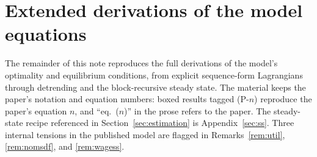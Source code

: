 \documentclass[11pt]{article}
\theoremstyle{definition}
\begin{document}
\newpage

\appendix
\section{Extended derivations of the model equations}\label{app:derivations}
The remainder of this note reproduces the full derivations of the model's optimality and equilibrium
conditions, from explicit sequence-form Lagrangians through detrending and the block-recursive steady
state. The material keeps the paper's notation and equation numbers: boxed results tagged (P-$n$)
reproduce the paper's equation $n$, and ``eq.\ ($n$)'' in the prose refers to the paper. The
steady-state recipe referenced in Section~\ref{sec:estimation} is
Appendix~\ref{sec:ss}. Three internal tensions in the published model are flagged in
Remarks~\ref{rem:util}, \ref{rem:nomsdf}, and \ref{rem:wagess}.


\end{document}
